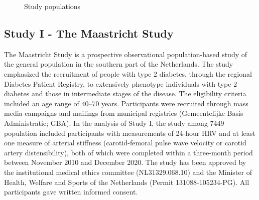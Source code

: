 \documentclass[
  a4paper,
  headsepline=true,
  open=any]{scrbook}
\begin{document}
\begin{figure}

\begin{minipage}[t]{\linewidth}

{\centering 


\caption{Study populations}

}

\end{minipage}%

\end{figure}

\hypertarget{study-i---the-maastricht-study}{%
\subsection{Study I - The Maastricht
Study}\label{study-i---the-maastricht-study}}

The Maastricht Study is a prospective observational population-based
study of the general population in the southern part of the Netherlands.
The study emphasized the recruitment of people with type 2 diabetes,
through the regional Diabetes Patient Registry, to extensively phenotype
individuals with type 2 diabetes and those in intermediate stages of the
disease. The eligibility criteria included an age range of 40--70 years.
Participants were recruited through mass media campaigns and mailings
from municipal registries (Gemeentelijke Basis Administratie; GBA). In
the analysis of Study I, the study among 7449 population included
participants with measurements of 24-hour HRV and at least one measure
of arterial stiffness (carotid-femoral pulse wave velocity or carotid
artery distensibility), both of which were completed within a
three-month period between November 2010 and December 2020. The study
has been approved by the institutional medical ethics committee
(NL31329.068.10) and the Minister of Health, Welfare and Sports of the
Netherlands (Permit 131088-105234-PG). All participants gave written
informed consent.
\end{document}
